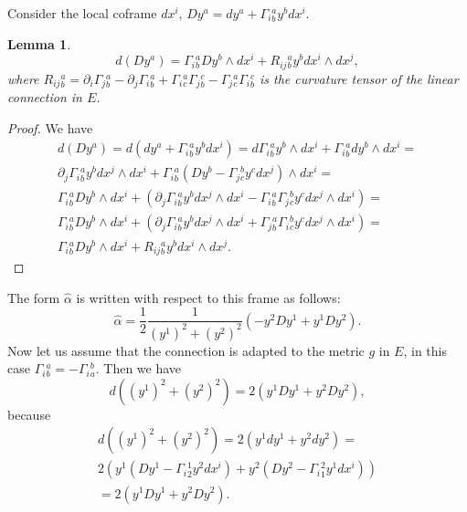 \documentclass[12pt,letterpaper]{amsart}
\theoremstyle{definition}
\theoremstyle{plain}
\newtheorem{lm}{Lemma}
\theoremstyle{remark}
\begin{document}
Consider the local coframe $dx^i$, $Dy^a = dy^a + \Gamma_i{ }^a_b y^b dx^i$.
\begin{lm}
\begin{equation}
d(Dy^a) = \Gamma_i{ }^a_b Dy^b \wedge dx^i + R_{ij}{ }^a_b y^b dx^i \wedge dx^j,
\label{eq:65}
\end{equation}
where $R_{ij}{ }^a_b = \partial_i \Gamma_j{ }^a_b - \partial_j \Gamma_i{ }^a_b + \Gamma_i{ }^a_c \Gamma_j{}^c_b - \Gamma_j{ }^a_c \Gamma_i{}^c_b$ is the curvature tensor of the linear connection in $E$.
\label{lm:2}
\end{lm}
\begin{proof}
We have
\begin{multline}
d(Dy^a) =d( dy^a + \Gamma_i{ }^a_b y^b dx^i ) =d\Gamma_i{ }^a_b y^b \wedge dx^i + \Gamma_i{ }^a_b dy^b \wedge dx^i =
\\
\partial_j\Gamma_i{ }^a_b y^b dx^j \wedge dx^i + \Gamma_i{ }^a_b (Dy^b - \Gamma_j{}^b_c y^c dx^j) \wedge dx^i =
\\
\Gamma_i{ }^a_b Dy^b \wedge dx^i +
\left(\partial_j\Gamma_i{ }^a_b y^b dx^j \wedge dx^i - \Gamma_i{ }^a_b \Gamma_j{}^b_c y^c dx^j \wedge dx^i \right) =
\\
\Gamma_i{ }^a_b Dy^b \wedge dx^i +
\left(\partial_j\Gamma_i{ }^a_b y^b dx^j \wedge dx^i + \Gamma_j{ }^a_b \Gamma_i{}^b_c y^c dx^j \wedge dx^i \right) =
\\
\Gamma_i{ }^a_b Dy^b \wedge dx^i + R_{ij}{ }^a_b y^b dx^i \wedge dx^j.
\label{eq:66}
\end{multline}
\end{proof}
The form $\hat{\alpha}$ is written with respect to this frame as follows:
\begin{equation}
\hat{\alpha} = \frac{1}{2}\frac{1}{(y^1)^2 + (y^2)^2} \left( -y^2 Dy^1 + y^1 Dy^2 \right).
\label{eq:67}
\end{equation}
Now let us assume that the connection is adapted to the metric $g$ in $E$, in this case
$\Gamma_i{}^a_b = -\Gamma_i{}^b_a$.
Then we have
\begin{equation}
d ((y^1)^2 + (y^2)^2 ) = 2 \left( y^1 Dy^1 + y^2 Dy^2 \right),
\label{eq:68}
\end{equation}
because
\begin{multline}
d ((y^1)^2 + (y^2)^2 ) =2 \left( y^1 dy^1 + y^2 dy^2 \right) =
\\
2 \left( y^1 (Dy^1 - \Gamma_i{}^1_2 y^2 dx^i) + y^2 (Dy^2 - \Gamma_i{}^2_1 y^1 dx^i) \right)
\\
= 2 \left( y^1 Dy^1 + y^2 Dy^2 \right).
\label{eq:69}
\end{multline}
\end{document}
